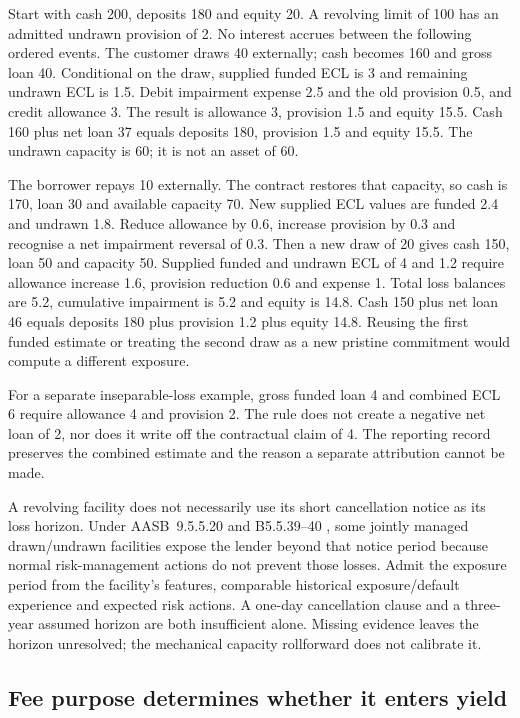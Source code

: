 Start with cash 200, deposits 180 and equity 20. A revolving limit of 100 has an admitted undrawn provision of 2. No interest accrues between the following ordered events. The customer draws 40 externally; cash becomes 160 and gross loan 40. Conditional on the draw, supplied funded ECL is 3 and remaining undrawn ECL is 1.5. Debit impairment expense 2.5 and the old provision 0.5, and credit allowance 3. The result is allowance 3, provision 1.5 and equity 15.5. Cash 160 plus net loan 37 equals deposits 180, provision 1.5 and equity 15.5. The undrawn capacity is 60; it is not an asset of 60.

The borrower repays 10 externally. The contract restores that capacity, so cash is 170, loan 30 and available capacity 70. New supplied ECL values are funded 2.4 and undrawn 1.8. Reduce allowance by 0.6, increase provision by 0.3 and recognise a net impairment reversal of 0.3. Then a new draw of 20 gives cash 150, loan 50 and capacity 50. Supplied funded and undrawn ECL of 4 and 1.2 require allowance increase 1.6, provision reduction 0.6 and expense 1. Total loss balances are 5.2, cumulative impairment is 5.2 and equity is 14.8. Cash 150 plus net loan 46 equals deposits 180 plus provision 1.2 plus equity 14.8. Reusing the first funded estimate or treating the second draw as a new pristine commitment would compute a different exposure.

For a separate inseparable-loss example, gross funded loan 4 and combined ECL 6 require allowance 4 and provision 2. The rule does not create a negative net loan of 2, nor does it write off the contractual claim of 4. The reporting record preserves the combined estimate and the reason a separate attribution cannot be made.

A revolving facility does not necessarily use its short cancellation notice as its loss horizon. Under AASB~9.5.5.20 and B5.5.39--40 \citep[5.5.20 and B5.5.39--40]{aasb9dated}, some jointly managed drawn/undrawn facilities expose the lender beyond that notice period because normal risk-management actions do not prevent those losses. Admit the exposure period from the facility's features, comparable historical exposure/default experience and expected risk actions. A one-day cancellation clause and a three-year assumed horizon are both insufficient alone. Missing evidence leaves the horizon unresolved; the mechanical capacity rollforward does not calibrate it.

\hypertarget{fee-purpose-determines-whether-it-enters-yield}{%
\subsection{Fee purpose determines whether it enters yield}\label{fee-purpose-determines-whether-it-enters-yield}}

